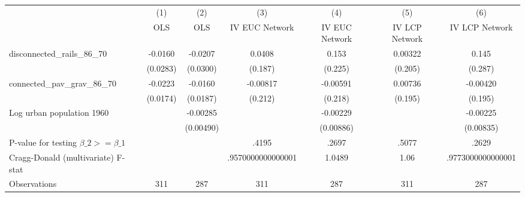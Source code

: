 {
\def\sym#1{\ifmmode^{#1}\else\(^{#1}\)\fi}
\begin{tabular}{l*{6}{c}}
\hline\hline
                &\multicolumn{1}{c}{(1)}&\multicolumn{1}{c}{(2)}&\multicolumn{1}{c}{(3)}&\multicolumn{1}{c}{(4)}&\multicolumn{1}{c}{(5)}&\multicolumn{1}{c}{(6)}\\
                &\multicolumn{1}{c}{OLS}&\multicolumn{1}{c}{OLS}&\multicolumn{1}{c}{IV EUC Network}&\multicolumn{1}{c}{IV EUC Network}&\multicolumn{1}{c}{IV LCP Network}&\multicolumn{1}{c}{IV LCP Network}\\
\hline
disconnected\_rails\_86\_70&  -0.0160         &  -0.0207         &   0.0408         &    0.153         &  0.00322         &    0.145         \\
                & (0.0283)         & (0.0300)         &  (0.187)         &  (0.225)         &  (0.205)         &  (0.287)         \\
[1em]
connected\_pav\_grav\_86\_70&  -0.0223         &  -0.0160         & -0.00817         & -0.00591         &  0.00736         & -0.00420         \\
                & (0.0174)         & (0.0187)         &  (0.212)         &  (0.218)         &  (0.195)         &  (0.195)         \\
[1em]
Log urban population 1960&                  & -0.00285         &                  & -0.00229         &                  & -0.00225         \\
                &                  &(0.00490)         &                  &(0.00886)         &                  &(0.00835)         \\
\hline
P-value for testing $\beta\_{2} >= \beta\_{1}$&                  &                  &    .4195         &    .2697         &    .5077         &    .2629         \\
Cragg-Donald (multivariate) F-stat&                  &                  &.9570000000000001         &   1.0489         &     1.06         &.9773000000000001         \\
Observations    &      311         &      287         &      311         &      287         &      311         &      287         \\
\hline\hline
\end{tabular}
}
